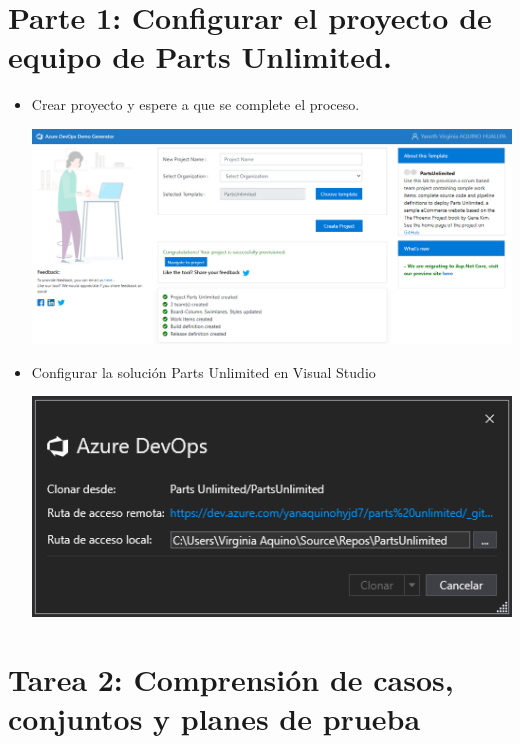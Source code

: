 \section{Parte 1:  Configurar el proyecto de equipo de Parts Unlimited.} 
\begin{itemize}
 \item  Crear proyecto y espere a que se complete el proceso.
\begin{center}
\includegraphics[width=\columnwidth]{images/1}\newline
\end{center}
 \item Configurar la solución Parts Unlimited en Visual Studio
\begin{center}
\includegraphics[width=\columnwidth]{images/2}\newline
\end{center} 
\end{itemize}

\section{Tarea 2: Comprensión de casos, conjuntos y planes de prueba} 

